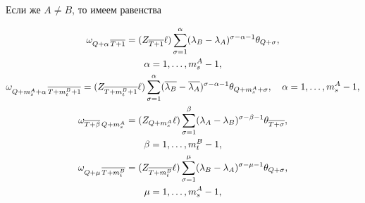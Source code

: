 Если же $A\neq B$, то имеем равенства


\begin{gather}


\allowdisplaybreaks


\label{2s2-71}


\omega_{Q+\alpha \, \ol{T+1}}=


(Z_{\ol{T+1}} \ell) \sum\limits_{\sigma=1}^\alpha


(\lambda_B -\lambda_A)^{\sigma - \alpha -1}


\theta_{Q+\sigma},\\


%


\alpha=1,\dotsc,m^A_s-1,\notag \\


%


\label{2s2-72}


\omega_{Q+m^A_s+\alpha \, \ol{T+m^B_t+1}}=


(Z_{\ol{T+m^B_t+1}} \ell) \sum\limits_{\sigma=1}^\alpha


(\ol{\lambda_B} -


\ol{\lambda_A})^{\sigma - \alpha -1} \theta_{Q+m^A_s+\sigma}, \quad


\alpha=1,\dotsc,m^A_s-1,\\


%


\label{2s2-75}


\omega_{\ol{T+\beta} \, Q+m^A_s}= (Z_{Q+m^A_s} \ell)


\sum\limits_{\sigma=1}^\beta (\lambda_A-\lambda_B)^{\sigma -\beta-1}


\theta_{\ol{T+\sigma}},\\


%


\beta = 1,\dotsc,m^B_t-1,\notag \\


%


\label{2s2-76}


\omega_{Q + \mu \, \ol{T+m^B_t}}=


(Z_{\ol{T+m^B_t}} \ell) \sum\limits_{\sigma=1}^\mu


(\lambda_B-\lambda_A)^{\sigma


-\mu-1} \theta_{Q+\sigma},\\


%


\mu = 1,\dotsc,m^A_s-1,\notag \\


%



\end{gather}
